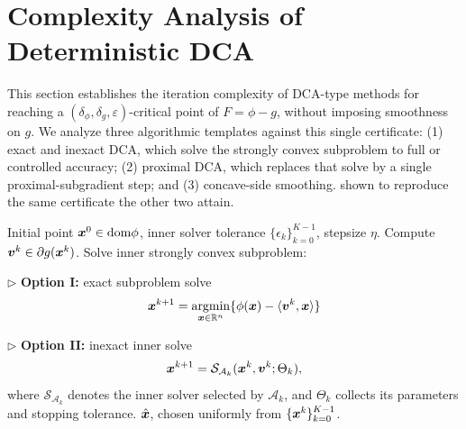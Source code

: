 \section{Complexity Analysis of Deterministic DCA}
\label{sec:complexity-analysis-DCA}

This section establishes the iteration complexity of DCA-type methods for
reaching a $(\delta_\phi,\delta_g,\varepsilon)$-critical point of
$F=\phi-g$, without imposing smoothness on $g$. We analyze three
algorithmic templates against this single certificate: (1) exact and inexact
DCA, which solve the strongly convex subproblem to full or controlled accuracy;
(2) proximal DCA, which replaces that solve by a single proximal-subgradient
step; and (3) concave-side smoothing.
shown to reproduce the same certificate the other two attain. 

\begin{algorithm}[tbp]
    \caption{\textbf{(In)exact DCA}}
    \label{alg: DCA}
    \begin{algorithmic}[1]
         Initial point $\bm{x}^0\in\mathrm{dom} \phi $,
        inner solver tolerance $\{\epsilon_k\}_{k=0}^{K-1}$,
        stepsize $\eta$.
            \STATE Compute $\bm{v}^k \in \partial g(\bm{x}^k)$.
            \STATE 
            Solve inner strongly convex subproblem:

            \STATE $\triangleright$ \textbf{Option I:} exact subproblem solve
            \begin{align}
            \label{eq:dca-exact-step}
            \bm{x}^{k+1} = \operatorname*{\mathrm{argmin}}\limits_{\bm{x} \in \mathbb{R}^n } \{ \phi (\bm{x})- \langle \bm{v}^k, \bm{x} \rangle \} 
            \end{align}

            \STATE $\triangleright$ \textbf{Option II:} inexact inner solve
            \begin{align}
            \label{eq:dca-inner-solver-step}
            \bm{x}^{k+1}
            =
            \mathcal S_{\mathcal A_k}(\bm{x}^k,\bm{v}^k;\Theta_k),
            \end{align}
            where $\mathcal S_{\mathcal A_k}$ denotes the inner solver selected
            by $\mathcal A_k$, and $\Theta_k$ collects its parameters and
            stopping tolerance.
        \ENDFOR
         $\hat{\bm{x}}$, chosen uniformly from
        $\{\bm{x}^k\}_{k=0}^{K-1}$.
    \end{algorithmic}
\end{algorithm} 

